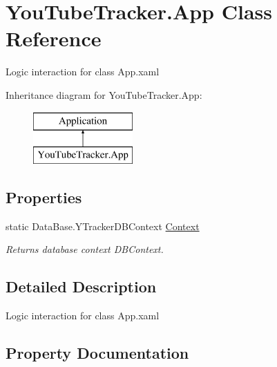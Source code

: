 \hypertarget{class_you_tube_tracker_1_1_app}{}\section{You\+Tube\+Tracker.\+App Class Reference}
\label{class_you_tube_tracker_1_1_app}


Logic interaction for class App.\+xaml  


Inheritance diagram for You\+Tube\+Tracker.\+App\+:\begin{figure}[H]
\begin{center}
\leavevmode
\includegraphics[height=2.000000cm]{class_you_tube_tracker_1_1_app}
\end{center}
\end{figure}
\subsection*{Properties}
\begin{DoxyCompactItemize}
\item 
static Data\+Base.\+Y\+Tracker\+D\+B\+Context \mbox{\hyperlink{class_you_tube_tracker_1_1_app_ac0a183370798e224e95ab6b5017de885}{Context}}
\begin{DoxyCompactList}\small\item\em Returns database context {\ttfamily D\+B\+Context}. \end{DoxyCompactList}\end{DoxyCompactItemize}


\subsection{Detailed Description}
Logic interaction for class App.\+xaml 



\subsection{Property Documentation}
\mbox{\label{class_you_tube_tracker_1_1_app_ac0a183370798e224e95ab6b5017de885}} 
